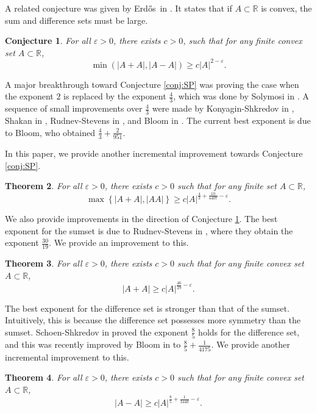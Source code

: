 \documentclass[reqno]{amsart}
\newcommand{\erdos}{Erd{\H{o}}s}
\let\epsilon\varepsilon
\numberwithin{equation}{section}
\newtheorem{theorem}{Theorem}[section]
\newtheorem{conjecture}[theorem]{Conjecture}
\begin{document}
A related conjecture was given by \erdos\ in \cite{erdos1977}. It states that
if \(A \subset \mathbb{R} \) is convex, the sum and difference sets must be large.

\begin{conjecture}\label{conj:convex}
For all \(\epsilon > 0\), there exists \(c > 0\), such that for any finite convex set \(A \subset \mathbb{R} \),
\[
    \min \left( \left\lvert A+A \right\rvert , \left\lvert A-A \right\rvert  \right)  \geq c \left\lvert A \right\rvert ^{2 - \epsilon}
.\]
\end{conjecture}

A major breakthrough toward Conjecture \ref{conj:SP} was proving the case when the exponent \(2\)
is replaced by the exponent \(\frac{4}{3} \),
which was done by Solymosi in \cite{Solymosi}. A sequence of small improvements over \(\frac{4}{3} \) were
made by Konyagin-Shkredov in \cite{konyagin-shkredov}, Shakan in \cite{shakan}, Rudnev-Stevens in \cite{rudnev-stevens}, and
Bloom in \cite{bloom}. The current best exponent is due to Bloom, who obtained
\(\frac{4}{3} + \frac{2}{951} \).

In this paper, we provide another incremental improvement towards Conjecture \ref{conj:SP}.

\begin{theorem}\label{thm-SP}
For all \(\epsilon > 0\), there exists \(c > 0\) such that for any finite set \(A \subset \mathbb{R} \),
\[
    \max \left\{ \left\lvert A+A \right\rvert , \left\lvert AA \right\rvert  \right\} \geq c\left\lvert A \right\rvert ^{\frac{4}{3} + \frac{10}{4407} - \epsilon} 
.\]
\end{theorem}

We also provide improvements in the direction of Conjecture \ref{conj:convex}.
The best exponent for the sumset is due to Rudnev-Stevens in \cite{rudnev-stevens},
where they obtain the exponent \(\frac{30}{19} \). We provide an improvement to this.
\begin{theorem}\label{thm-CSUM}
For all \(\epsilon > 0\), there exists \(c > 0\) such that for any finite convex set \(A \subset \mathbb{R} \),
\[
    \left\lvert A+A \right\rvert \geq c\left\lvert A \right\rvert ^{\frac{46}{29} - \epsilon}
.\]
\end{theorem}

The best exponent for the difference set is stronger than that of the sumset.
Intuitively, this is because the difference set possesses more symmetry than the sumset.
Schoen-Shkredov in \cite{schoen-shkredov} proved the exponent \(\frac{8}{5} \) holds for the difference set, and this
was recently improved by Bloom in \cite{bloom} to \(\frac{8}{5} + \frac{1}{4175}\).
We provide another incremental improvement to this.
\begin{theorem}\label{thm-CDIFF}
For all \(\epsilon > 0\), there exists \(c > 0\) such that for any finite convex set \(A \subset \mathbb{R} \),
\[
    \left\lvert A-A \right\rvert \geq c \left\lvert A \right\rvert ^{\frac{8}{5} + \frac{1}{3440}  - \epsilon}
.\]
\end{theorem}
\end{document}
